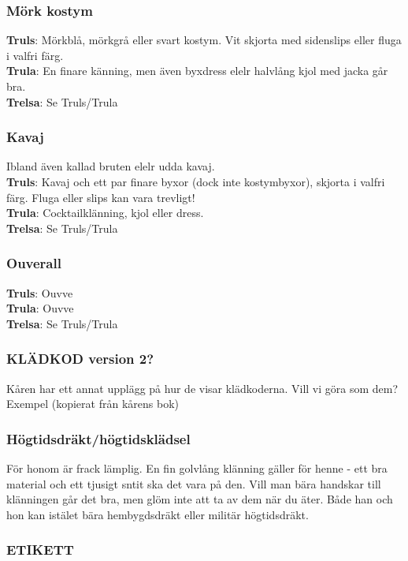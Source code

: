 \subsubsection*{Mörk kostym}
\textbf{Truls}: Mörkblå, mörkgrå eller svart kostym. Vit skjorta med sidenslips eller fluga i valfri färg.\\
\textbf{Trula}: En finare känning, men även byxdress elelr halvlång kjol med jacka går bra.\\
\textbf{Trelsa}: Se Truls/Trula

\subsubsection*{Kavaj}
Ibland även kallad bruten elelr udda kavaj.\\
\textbf{Truls}: Kavaj och ett par finare byxor (dock inte kostymbyxor), skjorta i valfri färg. Fluga eller slips kan vara trevligt!\\
\textbf{Trula}: Cocktailklänning, kjol eller dress.\\
\textbf{Trelsa}: Se Truls/Trula

\subsubsection*{Ouverall}
\textbf{Truls}: Ouvve\\
\textbf{Trula}: Ouvve\\
\textbf{Trelsa}: Se Truls/Trula

\newpage
\subsubsection*{KLÄDKOD version 2?}
Kåren har ett annat upplägg på hur de visar klädkoderna. Vill vi göra som dem?
\\

Exempel (kopierat från kårens bok)

\subsubsection*{Högtidsdräkt/högtidsklädsel}
För honom är frack lämplig. 
En fin golvlång klänning gäller för henne 
- ett bra material och ett tjusigt sntit ska det vara på den. 
Vill man bära handskar till klänningen går det bra, 
men glöm inte att ta av dem när du äter. 
Både han och hon kan istälet bära hembygdsdräkt eller militär högtidsdräkt.


\newpage

\subsubsection*{ETIKETT}

